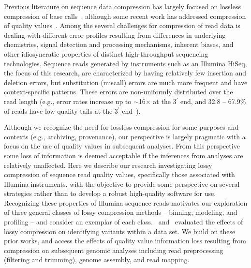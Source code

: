 \documentclass{bioinfo}
\begin{document}
Previous literature on sequence data compression has largely focused
on lossless compression of base calls~\cite[reviewed
  in][]{Deorowicz:2013hq,Giancarlo:2014rw,Giancarlo:2009fk,
  Nalbantoglu:2010uq,Zhu:2013qr}, although some recent work has
addressed compression of quality
values~\cite[e.g.,][]{asnani2012lossy,Canovas:2014fr,Hach:2012ys,
  janin2013adaptive,Kozanitis:2011kl,Ochoa:2013rt,Tembe:2010ys,
  Wan:2012kq,DBLP:conf/recomb/YuYB14,zhou2014compression}. Among the
several challenges for compression of read data is dealing with
different error profiles resulting from differences in underlying
chemistries, signal detection and processing mechanisms, inherent
biases, and other idiosyncratic properties of distinct high-throughput
sequencing technologies. Sequence reads generated by instruments such
as an Illumina HiSeq, the focus of this research, are characterized by
having relatively few insertion and deletion errors, but substitution
(miscall) errors are much more frequent and have context-specific
patterns. These errors are non-uniformly distributed over the read
length (e.g., error rates increase up to $\sim$16$\times$ at the
3$^{\prime}$ end, and 32.8 -- 67.9\% of reads have low quality tails
at the 3$^{\prime}$ end~\citep{Minoche:2011km}).

Although we recognize the need for lossless compression for some
purposes and contexts (e.g., archiving, provenance), our perspective
is largely pragmatic with a focus on the use of quality values in
subsequent analyses. From this perspective some loss of information is
deemed acceptable if the inferences from analyses are relatively
unaffected. Here we describe our research investigating lossy
compression of sequence read quality values, specifically those
associated with Illumina instruments, with the objective to provide
some perspective on several strategies rather than to develop a robust
high-quality software for use. Recognizing these properties of
Illumina sequence reads motivates our exploration of three general
classes of lossy compression methods -- binning, modeling, and
profiling -- and consider an exemplar of each
class.~\cite{Canovas:2014fr} and~\cite{janin2013adaptive} evaluated
the effects of lossy compression on identifying variants within a data
set. We build on these prior works, and access the effects of quality
value information loss resulting from compression on subsequent
genomic analyses including read preprocessing (filtering and
trimming), genome assembly, and read mapping.
\end{document}
